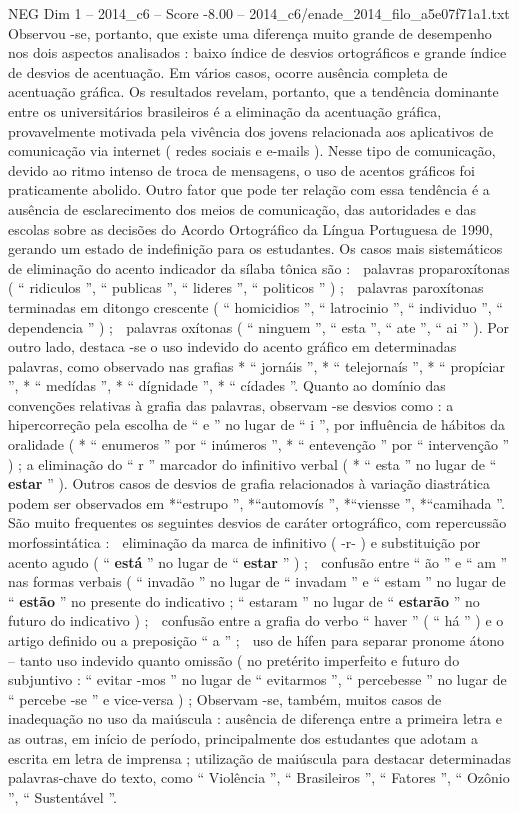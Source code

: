 \begin{textsample}{NEG Dim 1 – 2014\_c6 – Score -8.00 – 2014\_c6/enade\_2014\_filo\_a5e07f71a1.txt}
Observou -se, portanto, que existe uma diferença muito grande de desempenho nos dois aspectos analisados : baixo índice de desvios ortográficos e grande índice de desvios de acentuação.
Em vários casos, ocorre ausência completa de acentuação gráfica.
Os resultados revelam, portanto, que a tendência dominante entre os universitários brasileiros é a eliminação da acentuação gráfica, provavelmente motivada pela vivência dos jovens relacionada aos aplicativos de comunicação via internet ( redes sociais e e-mails ).
Nesse tipo de comunicação, devido ao ritmo intenso de troca de mensagens, o uso de acentos gráficos foi praticamente abolido.
Outro fator que pode ter relação com essa tendência é a ausência de esclarecimento dos meios de comunicação, das autoridades e das escolas sobre as decisões do Acordo Ortográfico da Língua Portuguesa de 1990, gerando um estado de indefinição para os estudantes.
Os casos mais sistemáticos de eliminação do acento indicador da sílaba tônica são :  palavras proparoxítonas ( “ ridiculos ”, “ publicas ”, “ lideres ”, “ politicos ” ) ;  palavras paroxítonas terminadas em ditongo crescente ( “ homicidios ”, “ latrocinio ”, “ individuo ”, “ dependencia ” ) ;  palavras oxítonas ( “ ninguem ”, “ esta ”, “ ate ”, “ ai ” ).
Por outro lado, destaca -se o uso indevido do acento gráfico em determinadas palavras, como observado nas grafias * “ jornáis ”, * “ telejornaís ”, * “ propíciar ”, * “ medídas ”, * “ dígnidade ”, * “ cídades ”.
Quanto ao domínio das convenções relativas à grafia das palavras, observam -se desvios como : a hipercorreção pela escolha de “ e ” no lugar de “ i ”, por influência de hábitos da oralidade ( * “ enumeros ” por “ inúmeros ”, * “ entevenção ” por “ intervenção ” ) ; a eliminação do “ r ” marcador do infinitivo verbal ( * “ esta ” no lugar de “ \textbf{estar} ” ).
Outros casos de desvios de grafia relacionados à variação diastrática podem ser observados em *“estrupo ”, *“automovís ”, *“viensse ”, *“camihada ”.
São muito frequentes os seguintes desvios de caráter ortográfico, com repercussão morfossintática :  eliminação da marca de infinitivo ( -r- ) e substituição por acento agudo ( “ \textbf{está} ” no lugar de “ \textbf{estar} ” ) ;  confusão entre “ ão ” e “ am ” nas formas verbais ( “ invadão ” no lugar de “ invadam ” e “ estam ” no lugar de “ \textbf{estão} ” no presente do indicativo ; “ estaram ” no lugar de “ \textbf{estarão} ” no futuro do indicativo ) ;  confusão entre a grafia do verbo “ haver ” ( “ há ” ) e o artigo definido ou a preposição “ a ” ;  uso de hífen para separar pronome átono – tanto uso indevido quanto omissão ( no pretérito imperfeito e futuro do subjuntivo : “ evitar -mos ” no lugar de “ evitarmos ”, “ percebesse ” no lugar de “ percebe -se ” e vice-versa ) ; Observam -se, também, muitos casos de inadequação no uso da maiúscula : ausência de diferença entre a primeira letra e as outras, em início de período, principalmente dos estudantes que adotam a escrita em letra de imprensa ; utilização de maiúscula para destacar determinadas palavras-chave do texto, como “ Violência ”, “ Brasileiros ”, “ Fatores ”, “ Ozônio ”, “ Sustentável ”.

\end{textsample}
